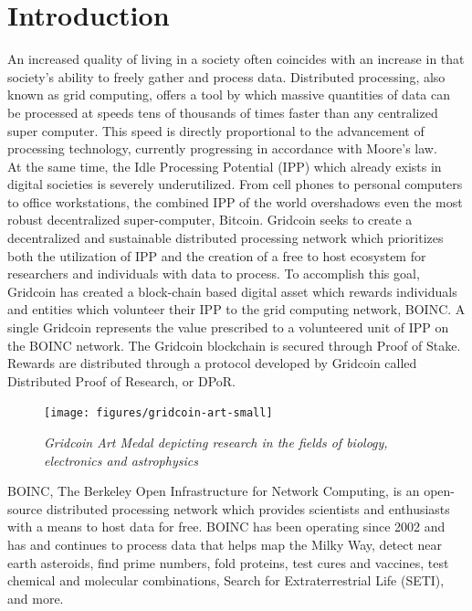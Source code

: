 \section{Introduction}

\label{sec:intro}

An increased quality of living in a society often coincides with an increase in that society’s ability to freely gather and process data.  Distributed processing, also known as grid computing, offers a tool by which massive quantities of data can be processed at speeds tens of thousands of times faster than any centralized super computer.  This speed is directly proportional to the advancement of processing technology, currently progressing in accordance with Moore’s law. \\

At the same time, the Idle Processing Potential (IPP) which already exists in digital societies is severely underutilized.  From cell phones to personal computers to office workstations, the combined IPP of the world overshadows even the most robust decentralized super-computer, Bitcoin.
Gridcoin seeks to create a decentralized and sustainable distributed processing network which prioritizes both the utilization of IPP and the creation of a free to host ecosystem for researchers and individuals with data to process.
To accomplish this goal, Gridcoin has created a block-chain based digital asset which rewards individuals and entities which volunteer their IPP to the grid computing network, BOINC.  A single Gridcoin represents the value prescribed to a volunteered unit of IPP on the BOINC network.  The Gridcoin blockchain is secured through Proof of Stake.  Rewards are distributed through a protocol developed by Gridcoin called Distributed Proof of Research, or DPoR.\\

\begin{figure}
\centering
\texttt{[image: figures/gridcoin-art-small]}
\medskip
\caption{\textit{Gridcoin Art Medal depicting research in the fields of biology, electronics and astrophysics}}
\small
\end{figure}


BOINC, The Berkeley Open Infrastructure for Network Computing, is an open-source distributed processing network which provides scientists and enthusiasts with a means to host data for free. BOINC has been operating since 2002 and has and continues to process data that helps map the Milky Way, detect near earth asteroids, find prime numbers, fold proteins, test cures and vaccines, test chemical and molecular combinations, Search for Extraterrestrial Life (SETI), and more.\\

